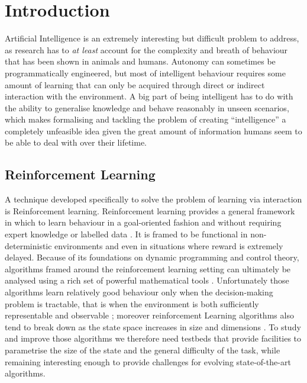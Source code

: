 \chapter{Introduction}

Artificial Intelligence is an extremely interesting but difficult problem to
address, as research has to \emph{at least} account for the complexity and
breath of behaviour that has been shown in animals and humans. Autonomy can
sometimes be programmatically engineered, but most of intelligent behaviour
requires some amount of learning that can only be acquired through direct or
indirect interaction with the environment. A big part of being intelligent has
to do with the ability to generalise knowledge and behave reasonably in unseen
scenarios, which makes formalising and tackling the problem of creating
``intelligence'' a completely unfeasible idea given the great amount of
information humans seem to be able to deal with over their lifetime.

\section{Reinforcement Learning}

A technique developed specifically to solve the problem of learning via
interaction is Reinforcement learning. Reinforcement learning provides a general
framework in which to learn behaviour in a goal-oriented fashion and without
requiring expert knowledge or labelled data \citep{Sutton:1998:IRL:551283}. It
is framed to be functional in non-deterministic environments and even in
situations where reward is extremely delayed. Because of its foundations on
dynamic programming and control theory, algorithms framed around the
reinforcement learning setting can ultimately be analysed using a rich set of
powerful mathematical tools \citep{puterman1990markov,beard1997galerkin}.
Unfortunately those algorithms learn relatively good behaviour only when the
decision-making problem is tractable, that is when the environment is both
sufficiently representable and observable \citep{kaelbling1996reinforcement};
moreover reinforcement Learning algorithms also tend to break down as the state
space increases in size and dimensions \citep{doya2000reinforcement}. To study
and improve those algorithms we therefore need testbeds that provide facilities
to parametrise the size of the state and the general difficulty of the task,
while remaining interesting enough to provide challenges for evolving
state-of-the-art algorithms.


